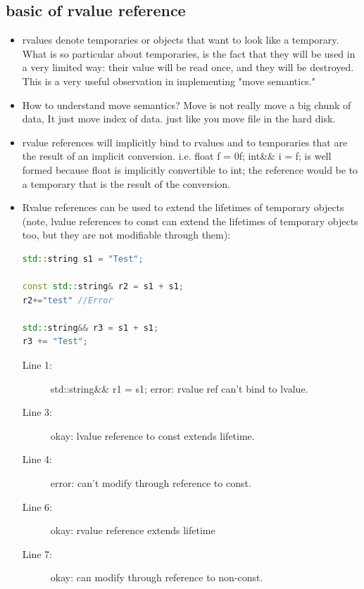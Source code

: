 \documentclass[a4paper,11pt,twoside]{book}
\begin{document}
\subsection{basic of rvalue reference}
\begin{itemize}

	\item rvalues denote temporaries or objects that want to look like a temporary. What is so particular about temporaries, is the fact that they will be used in a very limited way: their value will be read once, and they will be destroyed. This is a very useful observation in implementing "move semantics." 

	\item How to understand move semantics? Move is not really move a big chunk of data, It just move index of data. just like you move file in the hard disk. 

	\item rvalue references will implicitly bind to rvalues and to temporaries that are the result of an implicit conversion. i.e. float f = 0f; int\&\& i = f; is well formed because float is implicitly convertible to int; the reference would be to a temporary that is the result of the conversion.

	\item Rvalue references can be used to extend the lifetimes of temporary objects (note, lvalue references to const can extend the lifetimes of temporary objects too, but they are not modifiable through them):

\begin{lstlisting}[frame=single, language=c++, mathescape=true]
std::string s1 = "Test";

const std::string& r2 = s1 + s1; 
r2+="test" //Error

std::string&& r3 = s1 + s1;      
r3 += "Test";                    
\end{lstlisting}
\begin{description}
	\item[Line 1:] std::string\&\& r1 = s1; error: rvalue ref can't bind to lvalue.
	
	\item[Line 3:] okay: lvalue reference to const extends lifetime.

	\item[Line 4:] error: can't modify through reference to const.
	\item[Line 6:] okay: rvalue reference extends lifetime
	\item[Line 7:] okay: can modify through reference to non-const.
\end{description}

\end{itemize}
\end{document}
